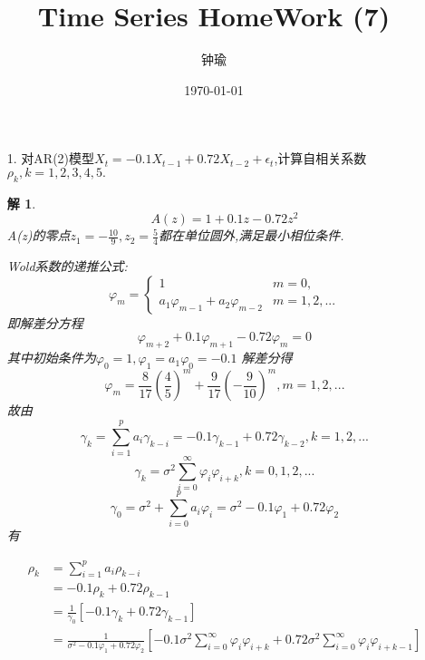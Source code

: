 \documentclass[11pt,a4paper]{ctexart}
\title{Time Series HomeWork (7)}
\author{钟瑜 \quad 222018314210044}
\date{\today}
\newtheorem*{solution}{解}
\begin{document}
\maketitle
\pagestyle{plain}%
\begin{enumerate}
	
\item[1.] 对AR(2)模型$ X_t=-0.1X_{t-1}+0.72X_{t-2}+\epsilon_t $,计算自相关系数$ \rho_k, k=1,2,3,4,5.$
\begin{solution}
	\begin{equation}
		A(z)=1+0.1z-0.72z^2
	\end{equation}
A(z)的零点$ z_1=-\frac{10}{9} ,z_2=\frac{5}{4}$都在单位圆外,满足最小相位条件.

Wold系数的递推公式:
\[
\varphi_m =
\begin{cases}
	1 &  m=0 ,\\
	a_1\varphi_{m-1}+a_2\varphi_{m-2} &  m=1,2,...
\end{cases}
\]
即解差分方程
\begin{equation}
	\varphi_{m+2}+0.1\varphi_{m+1}-0.72\varphi_m=0
\end{equation}
其中初始条件为$ \varphi_0=1,\varphi_1=a_1\varphi_0=-0.1 $
解差分得$$\varphi_m=\frac{8}{17}(\frac{4}{5})^m+\frac{9}{17}(-\frac{9}{10})^m,m=1,2,...$$
故由
\begin{equation}
	\gamma_k=\sum_{i=1}^{p}a_i\gamma_{k-i}=-0.1\gamma_{k-1}+0.72\gamma_{k-2},k=1,2,...
\end{equation}
\begin{equation}
	\gamma_k=\sigma^2\sum_{i=0}^{\infty}\varphi_i\varphi_{i+k},k=0,1,2,...
\end{equation}
\begin{equation}
	\gamma_0=\sigma^2+\sum_{i=0}^{p}a_i\varphi_i=\sigma^2-0.1\varphi_1+0.72\varphi_2
\end{equation}
有

\begin{equation}
\begin{aligned}
	\rho_k &=\sum_{i=1}^{p}a_i\rho_{k-i}\\
	&=-0.1\rho_k+0.72\rho_{k-1}\\
	&=\frac{1}{\gamma_0}[-0.1\gamma_k+0.72\gamma_{k-1}]\\
	&=\frac{1}{\sigma^2-0.1\varphi_1+0.72\varphi_2}[-0.1\sigma^2\sum_{i=0}^{\infty}\varphi_i\varphi_{i+k}+0.72\sigma^2\sum_{i=0}^{\infty}\varphi_i\varphi_{i+k-1}]\\
\end{aligned}
\end{equation}
\end{solution}



\end{enumerate}
\end{document}
